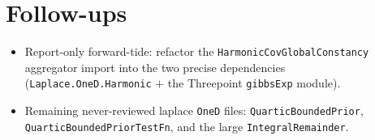 \documentclass[11pt]{article}
\begin{document}
\section{Follow-ups}
\begin{itemize}[noitemsep]
  \item Report-only forward-tide: refactor the \texttt{HarmonicCovGlobalConstancy} aggregator import
    into the two precise dependencies (\texttt{Laplace.OneD.Harmonic} $+$ the Threepoint
    \texttt{gibbsExp} module).
  \item Remaining never-reviewed laplace \texttt{OneD} files: \texttt{QuarticBoundedPrior},
    \texttt{QuarticBoundedPriorTestFn}, and the large \texttt{IntegralRemainder}.
\end{itemize}
\end{document}
